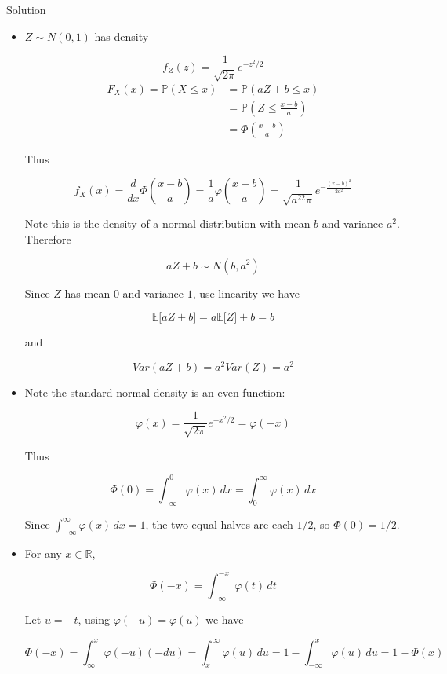 \documentclass{qlnotes-export}
\begin{document}
\begin{qlsolution}{Solution}

\begin{itemize}
\item
  \(Z \sim N(0,1)\) has density

  \[f_{Z}(z) = \frac{1}{\sqrt{2\pi}}e^{- z^{2}/2}\]\[\begin{matrix}
  {F_{X}(x) = {\mathbb{P}}(X \leq x)} & {= {\mathbb{P}}(aZ + b \leq x)} \\
   & {= {\mathbb{P}}\left( {Z \leq \frac{x - b}{a}} \right)} \\
   & {= \Phi\left( \frac{x - b}{a} \right)}
  \end{matrix}\]

  Thus

  \[f_{X}(x) = \frac{d}{dx}\Phi\left( \frac{x - b}{a} \right) = \frac{1}{a}\varphi\left( \frac{x - b}{a} \right) = \frac{1}{\sqrt{a^{22}\pi}}e^{- \frac{(x - b)^{2}}{2a^{2}}}\]

  Note this is the density of a normal distribution with mean \(b\) and variance \(a^{2}\). Therefore

  \[aZ + b \sim N(b,a^{2})\]

  Since \(Z\) has mean \(0\) and variance \(1\), use linearity we have

  \[{\mathbb{E}}\lbrack aZ + b\rbrack = a{\mathbb{E}}\lbrack Z\rbrack + b = b\]

  and

  \[Var(aZ + b) = a^{2}Var(Z) = a^{2}\]
\item
  Note the standard normal density is an even function:

  \[\varphi(x) = \frac{1}{\sqrt{2\pi}}e^{- x^{2}/2} = \varphi( - x)\]

  Thus

  \[\Phi(0) = \int_{- \infty}^{0}\varphi(x)\, dx = \int_{0}^{\infty}\varphi(x)\, dx\]

  Since \(\int_{- \infty}^{\infty}\varphi(x)\, dx = 1\), the two equal halves are each \(1/2\), so \(\Phi(0) = 1/2\).
\item
  For any \(x \in {\mathbb{R}}\),

  \[\Phi( - x) = \int_{- \infty}^{- x}\varphi(t)\, dt\]

  Let \(u = - t\), using \(\varphi( - u) = \varphi(u)\) we have

  \[\Phi( - x) = \int_{\infty}^{x}\varphi( - u)( - du) = \int_{x}^{\infty}\varphi(u)\, du = 1 - \int_{- \infty}^{x}\varphi(u)\, du = 1 - \Phi(x)\]
\end{itemize}

\end{qlsolution}
\end{document}
